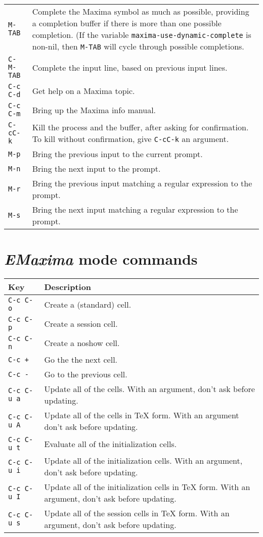 \documentclass{article}
\newcommand{\emx}{\textsl{\sffamily EMaxima}}
\begin{document}
\begin{tabular}{p{\firstcol}p{\secondcol}}
\texttt{M-TAB} & Complete the Maxima symbol as much as possible, providing
     a completion buffer if there is more than one possible
     completion.  (If the variable
     \texttt{maxima-use-dynamic-complete} is non-nil, then
     \texttt{M-TAB} will cycle through possible completions.\\
\texttt{C-M-TAB} & Complete the input line, based on previous input lines.\\
\texttt{C-c C-d} & Get help on a Maxima topic.\\
\texttt{C-c C-m} & Bring up the Maxima info manual.\\
\texttt{C-cC-k} & Kill the process and the buffer, after asking for
  confirmation.  To kill without confirmation, give \texttt{C-cC-k} an
  argument.\\
\texttt{M-p} & Bring the previous input to the current prompt.\\
\texttt{M-n} & Bring the next input to the prompt.\\
\texttt{M-r} & Bring the previous input matching
  a regular expression to the prompt.\\
\texttt{M-s} & Bring the next input matching
  a regular expression to the prompt.
\end{tabular}



\newpage

\section{\emx{} mode commands}

\noindent
\begin{tabular}{p{\firstcol}p{\secondcol}}
\hline
\textbf{Key} & \textbf{Description}\\
\hline
\texttt{C-c C-o} & Create a (standard) cell.\\
\texttt{C-c C-p} & Create a session cell.\\
\texttt{C-c C-n} & Create a noshow cell.\\
\texttt{C-c +} & Go the the next cell.\\
\texttt{C-c -} & Go to the previous cell.\\
\texttt{C-c C-u a} & 
Update all of the cells.  With an argument, don't ask before updating.\\
\texttt{C-c C-u A}
& Update all of the cells in \TeX{} form. With an argument don't ask
before updating.\\
\texttt{C-c C-u t}
& Evaluate all of the initialization cells.\\
\texttt{C-c C-u i}
& Update all of the initialization cells.  With an argument, don't
ask before updating.\\
\texttt{C-c C-u I}
& Update all of the initialization cells in \TeX{} form.  With an
argument, don't ask before updating.\\
\texttt{C-c C-u s}
& Update all of the session cells in \TeX{} form.  With an
argument, don't ask before updating.
\end{tabular}
\end{document}
